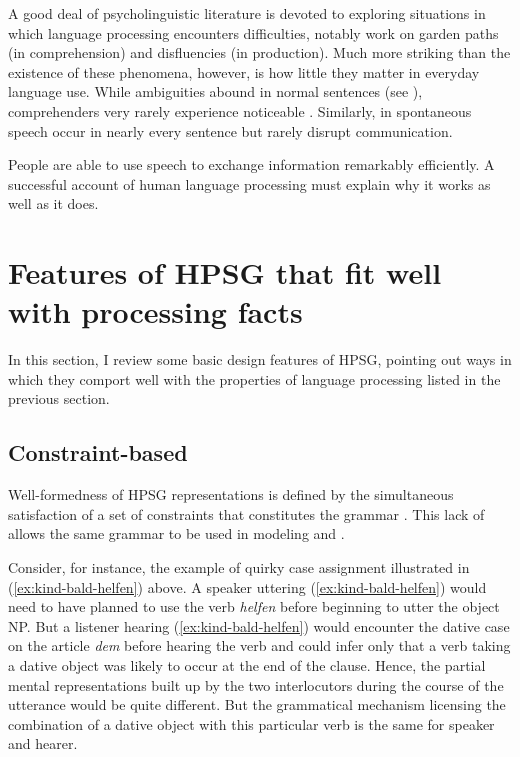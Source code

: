 \documentclass[output=paper
	        ,collection
	        ,collectionchapter
 	        ,biblatex
                ,babelshorthands
                ,newtxmath
                ,draftmode
                ,colorlinks, citecolor=brown
]{langscibook}
\begin{document}
A good deal of psycholinguistic literature is devoted to exploring situations in which language processing encounters difficulties, notably work on garden paths (in comprehension) and disfluencies (in production).  Much more striking than the existence of these phenomena, however, is how little they matter in everyday language use.  While ambiguities abound in normal sentences (see \citealt{Wasow2015}), comprehenders very rarely experience noticeable .  Similarly,  in spontaneous speech occur in nearly every sentence but rarely disrupt communication.  

People are able to use speech to exchange information remarkably efficiently.  A successful account of human language processing must explain why it works as well as it does.  

\section{Features of HPSG that fit well with processing facts}
\label{sec-features-of-HPSG}

In this section, I review some basic design features of HPSG, pointing out ways in which they comport well with the properties of language processing listed in the previous section.

\subsection{Constraint-based}
\label{sec-processing-constraint-based}

Well-formedness of HPSG representations is defined by the simultaneous satisfaction of a set of
constraints that constitutes the grammar \crossrefchapterp[\page
\pageref{page-wellformedness-linguistic-objects}]{formal-background}.  This lack of
 allows the same grammar to be used in modeling  and .

Consider, for instance, the example of quirky case assignment illustrated in (\ref{ex:kind-bald-helfen}) above.  A speaker uttering (\ref{ex:kind-bald-helfen}) would need to have planned to use the verb \emph{helfen} before beginning to utter the object NP.  But a listener hearing (\ref{ex:kind-bald-helfen}) would encounter the dative case on the article \emph{dem} before hearing the verb and could infer only that a verb taking a dative object was likely to occur at the end of the clause.  Hence, the partial mental representations built up by the two interlocutors during the course of the utterance would be quite different.  But the grammatical mechanism licensing the combination of a dative object with this particular verb is the same for speaker and hearer. 
\end{document}
